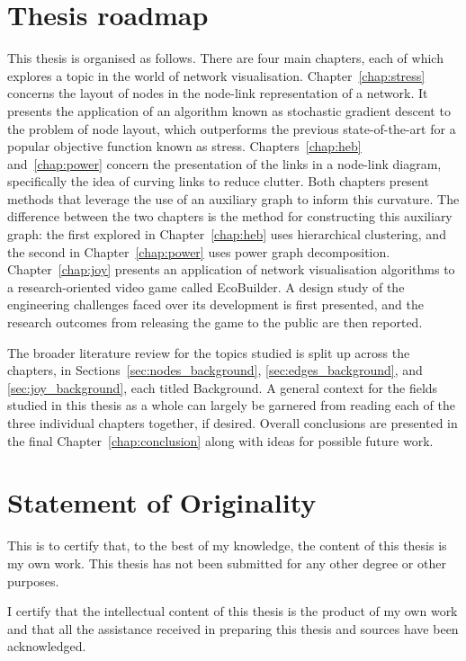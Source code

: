 \section{Thesis roadmap}
This thesis is organised as follows. There are four main chapters, each of which explores a topic in the world of network visualisation. Chapter~\ref{chap:stress} concerns the layout of nodes in the node-link representation of a network. It presents the application of an algorithm known as stochastic gradient descent to the problem of node layout, which outperforms the previous state-of-the-art for a popular objective function known as stress.
Chapters~\ref{chap:heb} and~\ref{chap:power} concern the presentation of the links in a node-link diagram, specifically the idea of curving links to reduce clutter. Both chapters present methods that leverage the use of an auxiliary graph to inform this curvature.
The difference between the two chapters is the method for constructing this auxiliary graph: the first explored in Chapter~\ref{chap:heb} uses hierarchical clustering, and the second in Chapter~\ref{chap:power} uses power graph decomposition.
Chapter~\ref{chap:joy} presents an application of network visualisation algorithms to a research-oriented video game called EcoBuilder. A design study of the engineering challenges faced over its development is first presented, and the research outcomes from releasing the game to the public are then reported.

The broader literature review for the topics studied is split up across the chapters, in Sections~\ref{sec:nodes_background}, \ref{sec:edges_background}, and \ref{sec:joy_background}, each titled Background. A general context for the fields studied in this thesis as a whole can largely be garnered from reading each of the three individual chapters together, if desired. 
Overall conclusions are presented in the final Chapter~\ref{chap:conclusion} along with ideas for possible future work.

\section{Statement of Originality}
This is to certify that, to the best of my knowledge, the content of this thesis is my own work. This thesis has not been submitted for any other degree or other purposes.

I certify that the intellectual content of this thesis is the product of my own work and that all the assistance received in preparing this thesis and sources have been acknowledged.

